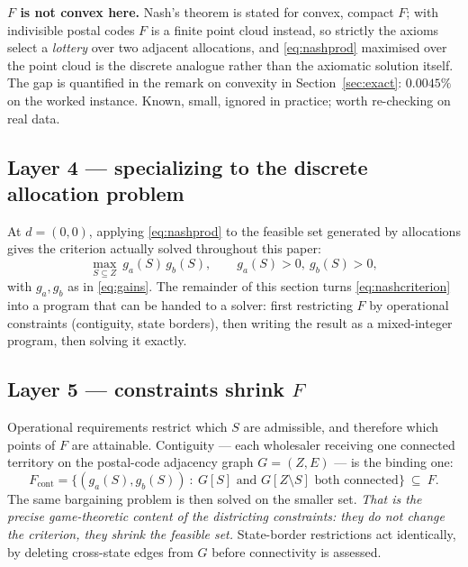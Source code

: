 \documentclass[11pt]{article}
\theoremstyle{remark}\newtheorem*{remark}{Remark}
\begin{document}
\begin{warnbox}
\textbf{$F$ is not convex here.} Nash's theorem is stated for convex, compact $F$; with
indivisible postal codes $F$ is a finite point cloud instead, so strictly the axioms
select a \emph{lottery} over two adjacent allocations, and \eqref{eq:nashprod} maximised
over the point cloud is the discrete analogue rather than the axiomatic solution itself.
The gap is quantified in the remark on convexity in Section~\ref{sec:exact}: $0.0045\%$
on the worked instance. Known, small, ignored in practice; worth re-checking on real
data.
\end{warnbox}

\subsection{Layer 4 --- specializing to the discrete allocation problem}
At $d=(0,0)$, applying \eqref{eq:nashprod} to the feasible set generated by allocations
gives the criterion actually solved throughout this paper:
\begin{equation}\label{eq:nashcriterion}
\max_{S\subseteq Z}\ g_a(S)\,g_b(S),\qquad g_a(S)>0,\ g_b(S)>0,
\end{equation}
with $g_a,g_b$ as in \eqref{eq:gains}. The remainder of this section turns
\eqref{eq:nashcriterion} into a program that can be handed to a solver: first restricting
$F$ by operational constraints (contiguity, state borders), then writing the result as a
mixed-integer program, then solving it exactly.

\subsection{Layer 5 --- constraints shrink $F$}
Operational requirements restrict which $S$ are admissible, and therefore which points of
$F$ are attainable. Contiguity --- each wholesaler receiving one connected territory on
the postal-code adjacency graph $G=(Z,E)$ --- is the binding one:
\begin{equation}
F_{\text{cont}}=\bigl\{(g_a(S),g_b(S))\ :\ G[S]\text{ and }G[Z\setminus S]\text{ both connected}\bigr\}\ \subseteq\ F .
\end{equation}
The same bargaining problem is then solved on the smaller set. \emph{That is the precise
game-theoretic content of the districting constraints: they do not change the criterion,
they shrink the feasible set.} State-border restrictions act identically, by deleting
cross-state edges from $G$ before connectivity is assessed.
\end{document}
